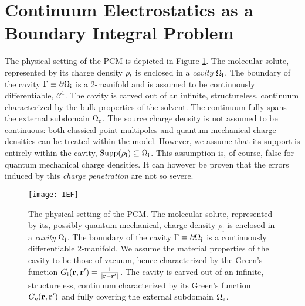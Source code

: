 
\section{Continuum Electrostatics as a Boundary Integral Problem}\label{sec:IEF}

The physical setting of the \ac{PCM} is depicted in Figure \ref{fig:IEF}.
The molecular solute, represented by its charge density
$\rho_\mathrm{i}$ is enclosed in a \emph{cavity} $\Omega_\mathrm{i}$.
The boundary of the cavity $\Gamma\equiv\partial\Omega_\mathrm{i}$ is a
2-manifold and is assumed to be continuously differentiable, \ie $\mathcal{C}^1$.
The cavity is carved out of an infinite, structureless, continuum
characterized by the bulk properties of the solvent.
The continuum fully spans the external subdomain $\Omega_\mathrm{e}$.
The source charge density is not assumed to be continuous: both
classical point multipoles and quantum mechanical charge densities can
be treated within the model.
However, we assume that its support is entirely within the cavity,
$\mathop{}\!\mathrm{Supp}(\rho_\mathrm{i}) \subseteq \Omega_\mathrm{i}$. This assumption is, of course, false
for quantum mechanical charge densities. It can however be proven that
the errors induced by this \emph{charge penetration} are not so
severe.~\autocite{Chipman2000-us, Cances2001-qs, Cances2001-qn}

\begin{figure}[tb]
  \centering
  \texttt{[image: IEF]}
  \caption[The physical setting of the polarizable continuum model.]{
  The physical setting of the \ac{PCM}. The molecular solute,
  represented by its, possibly quantum mechanical, charge density
  $\rho_\mathrm{i}$ is enclosed in a \emph{cavity} $\Omega_\mathrm{i}$.
  The boundary of the cavity $\Gamma\equiv\partial\Omega_\mathrm{i}$ is a
  continuously differentiable 2-manifold.
  We assume the material properties of the cavity to be those of vacuum,
  hence characterized by the Green's function
  $G_\mathrm{i}(\mathbf{r}, \mathbf{r}^\prime)=\frac{1}{|\mathbf{r}-\mathbf{r}^\prime|}$.
  The cavity is carved out of an infinite, structureless, continuum
  characterized by its Green's function $G_\mathrm{e}(\mathbf{r}, \mathbf{r}^\prime)$ and fully covering the
  external subdomain $\Omega_\mathrm{e}$.
  }
  \label{fig:IEF}
\end{figure}

